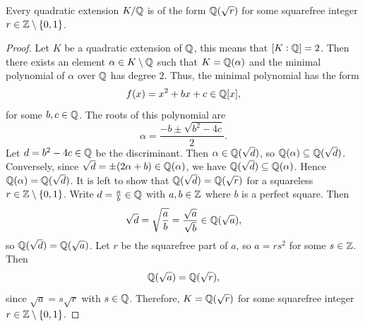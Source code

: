 \documentclass[11pt,a4paper]{article}
\begin{document}
\begin{lemma}
  Every quadratic extension $K/\mathbb{Q}$ is of the form $\mathbb{Q}(\sqrt r)$ for some
  squarefree integer $r \in \mathbb{Z} \setminus \left\{0,1\right\}$.
\end{lemma}
\begin{proof}
  Let $K$ be a quadratic extension of $\mathbb{Q}$, this means that $[K : \mathbb{Q}] = 2$.
  Then there exists an element $\alpha \in K \setminus \mathbb{Q}$ such that
  $K = \mathbb{Q}(\alpha)$ and the minimal polynomial of $\alpha$ over $\mathbb{Q}$ has
  degree $2$.
  Thus, the minimal polynomial has the form
  \[
    f(x) = x^2 + bx + c \in \mathbb{Q}[x],
  \]
  for some $b, c \in \mathbb{Q}$.
  The roots of this polynomial are
  \[
    \alpha = \frac{-b \pm \sqrt{b^2 - 4c}}{2}.
  \]
  Let $d = b^2 - 4c \in \mathbb{Q}$ be the discriminant.
  Then $\alpha \in \mathbb{Q}(\sqrt{d})$, so $\mathbb{Q}(\alpha) \subseteq \mathbb{Q}(\sqrt{d})$.
  Conversely, since $\sqrt{d} = \pm (2\alpha + b) \in \mathbb{Q}(\alpha)$,
  we have $\mathbb{Q}(\sqrt{d}) \subseteq \mathbb{Q}(\alpha)$. 
  Hence $\mathbb{Q}(\alpha) = \mathbb{Q}(\sqrt{d})$.
  It is left to show that $\mathbb{Q}(\sqrt d) = \mathbb{Q}(\sqrt r)$ for a squareless
  $r \in \mathbb{Z} \setminus \left\{0,1\right\}$.
  Write $d = \frac{a}{b} \in \mathbb{Q}$ with $a, b \in \mathbb{Z}$ where $b$ is a perfect
  square. Then
  \[
    \sqrt{d} = \sqrt{\frac{a}{b}} = \frac{\sqrt{a}}{\sqrt{b}} \in \mathbb{Q}(\sqrt{a}),
  \]
  so $\mathbb{Q}(\sqrt{d}) = \mathbb{Q}(\sqrt{a})$.
  Let $r$ be the squarefree part of $a$, so $a = rs^2$ for some $s \in \mathbb{Z}$.
  Then
  \[
    \mathbb{Q}(\sqrt{a}) = \mathbb{Q}(\sqrt{r}),
  \]
  since $\sqrt{a} = s\sqrt{r}$ with $s \in \mathbb{Q}$.
  Therefore, $K = \mathbb{Q}(\sqrt{r})$ for some squarefree integer
  $r \in \mathbb{Z} \setminus \left\{0,1\right\}$.
\end{proof}
\end{document}
